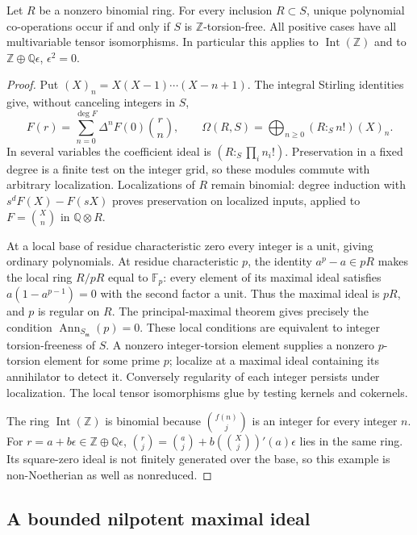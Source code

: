 \begin{corollary}\label{cor:binomial-arbitrary-coefficients}
Let $R$ be a nonzero binomial ring. For every inclusion $R\subset S$,
unique polynomial co-operations occur if and only if $S$ is
$\mathbb Z$-torsion-free. All positive cases have all multivariable
tensor isomorphisms. In particular this applies to
$\operatorname{Int}(\mathbb Z)$ and to
$\mathbb Z\oplus\mathbb Q\epsilon$, $\epsilon^2=0$.
\end{corollary}
\begin{proof}
Put $(X)_n=X(X-1)\cdots(X-n+1)$. The integral Stirling identities
give, without canceling integers in $S$,
\[
 F(r)=\sum_{n=0}^{\deg F}\Delta^nF(0)\binom rn,
 \qquad
 \Omega(R,S)=\bigoplus_{n\ge0}(R:_S n!)(X)_n.
\]
In several variables the coefficient ideal is
$(R:_S\prod_i n_i!)$. Preservation in a fixed degree is a finite
test on the integer grid, so these modules commute with arbitrary
localization. Localizations of $R$ remain binomial: degree induction
with $s^dF(X)-F(sX)$ proves preservation on localized inputs,
applied to $F=\binom Xn$ in $\mathbb Q\otimes R$.

At a local base of residue characteristic zero every integer is
a unit, giving ordinary polynomials. At residue characteristic
$p$, the identity $a^p-a\in pR$ makes the local ring $R/pR$
equal to $\mathbb F_p$: every element of its maximal ideal
satisfies $a(1-a^{p-1})=0$ with the second factor a unit.
Thus the maximal ideal is $pR$, and $p$ is regular on $R$.
The principal-maximal theorem gives precisely the condition
$\operatorname{Ann}_{S_{\mathfrak m}}(p)=0$.
These local conditions are equivalent to integer torsion-freeness
of $S$. A nonzero integer-torsion element supplies a nonzero
$p$-torsion element for some prime $p$; localize at a maximal ideal
containing its annihilator to detect it. Conversely regularity of
each integer persists under localization. The local tensor
isomorphisms glue by testing kernels and cokernels.

The ring $\operatorname{Int}(\mathbb Z)$ is binomial because
$\binom{f(n)}j$ is an integer for every integer $n$. For
$r=a+b\epsilon\in\mathbb Z\oplus\mathbb Q\epsilon$,
$\binom rj=\binom aj+b(\binom Xj)'(a)\epsilon$ lies in the same
ring. Its square-zero ideal is not finitely generated over the
base, so this example is non-Noetherian as well as nonreduced.
\end{proof}

\subsection{A bounded nilpotent maximal ideal}

